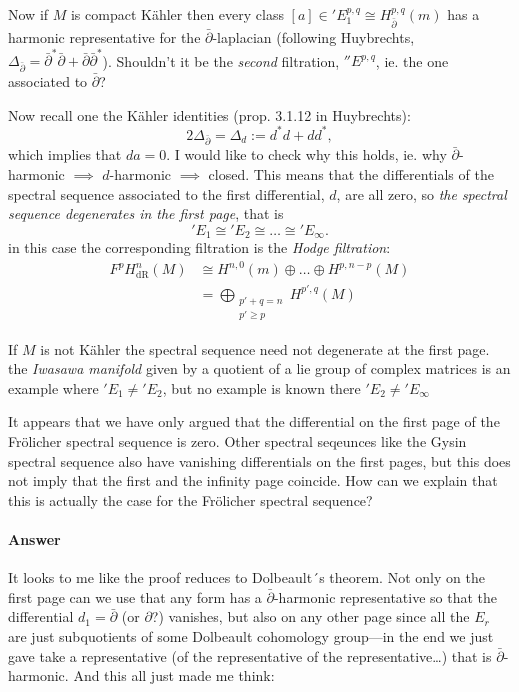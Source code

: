 Now if $M$ is compact K\"ahler then every
class $[a]\in 'E^{p,q}_1\cong
H^{p,q}_{\bar\partial}(m)$ has a harmonic
representative for the
$\bar\partial$-laplacian (following
Huybrechts,
$\Delta_{\bar\partial}=
\bar\partial^*\bar\partial+
\bar\partial\bar\partial^*$).
Shouldn't it be the \textit{second}
filtration, $''E^{p,q}$, ie. the one
associated to $\bar\partial$?

Now recall one the K\"ahler identities (prop.
3.1.12 in Huybrechts):
$$2\Delta_{\bar\partial}=\Delta_d:=d^*d+dd^*,
$$
which implies that $da=0$. I would like to
check why this holds, ie. why
$\bar\partial$-harmonic $\implies$
$d$-harmonic $\implies$ closed. This means
that the differentials of the spectral
sequence associated to the first
differential, $d$, are all zero, so
\textit{the spectral sequence degenerates in
the first page}, that is
$$'E_1\cong 'E_2\cong \ldots\cong
'E_{\infty}.$$
in this case the corresponding filtration is
the {\it Hodge filtration}:
$$
\begin{aligned}
	F^pH^{n}_{\text{dR}}(M)&\cong
	H^{n,0}(m)\oplus\ldots\oplus H^{p,n-p}(M)\\
				       &=\bigoplus_{\substack{p'+q=n \\
				       p'\geq p}}  H^{p',q}(M)
\end{aligned}
$$
\begin{remark}
\label{remark-if-m-not-k-ahler-spect-seque}
If $M$ is not K\"ahler the spectral sequence
need not degenerate at the first page. the
{\it Iwasawa manifold} given by a quotient of
a lie group of complex matrices is an example
where $'E_1\neq 'E_2$, but no example is
known there ${'E_2\neq 'E_{\infty}}$
\end{remark}

\begin{remark}
\label{remark-altan}
	It appears that we have only argued that the
	differential on the first page of the
	Fr\"olicher spectral sequence is zero. Other
	spectral seqeunces like the Gysin spectral
	sequence also have vanishing differentials
	on the first pages, but this does not imply
	that the first and the infinity page
	coincide. How can we explain that this is
	actually the case for the Fr\"olicher
	spectral sequence?
\end{remark}

\paragraph{Answer}It looks to me like the
proof reduces to Dolbeault´s theorem. Not
only on the first page can we use that any
form has a $\bar\partial$-harmonic
representative so that the differential
$d_1=\bar\partial$ (or $\partial$?) vanishes,
but also on any other page since all the
$E_{r}$ are just subquotients of some
Dolbeault cohomology group---in the end we
just gave take a representative (of the
representative of the representative…) that
is $\bar\partial$-harmonic. And this all just
made me think:

